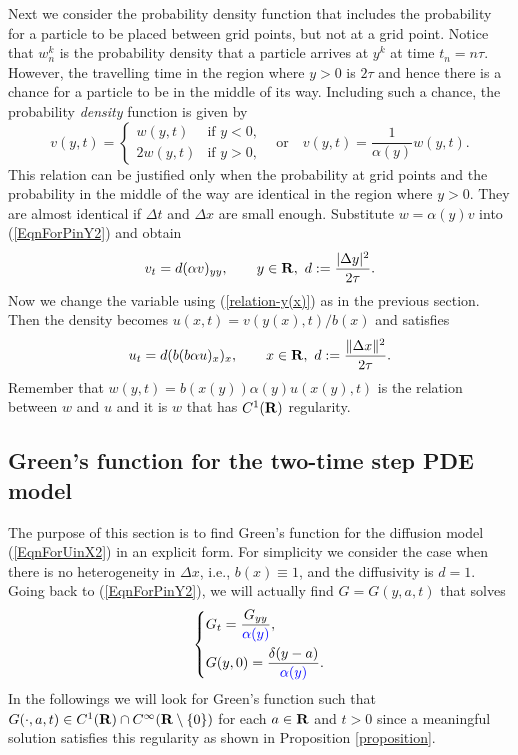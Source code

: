 \documentclass[11pt]{amsart}
\def\blue{\color{blue}}
\def\R{{\bf R}}
\def\R{\mathbb{R}}
\def\d{d}
\def\R{{\bf R}}
\def\bfR{{\bf R}}
\begin{document}
Next we consider the probability density function that includes the probability for a particle to be placed between grid points, but not at a grid point. Notice that $w_n^k$ is the probability density that a particle arrives at $y^k$ at time $t_n=n\tau$. However, the travelling time in the region where $y>0$ is $2\tau$ and hence there is a chance for a particle to be in the middle of its way. Including such a chance, the probability \emph{density} function is given by
\begin{equation*}\label{density}
v(y,t)=
\begin{cases}
w(y,t) & \text{if $y<0$,}\\
2w(y,t) & \text{if $y>0$,}
\end{cases}
\quad \text{or}\quad v(y,t)=\frac{1}{\alpha(y)}w(y,t).
\end{equation*}
This relation can be justified only when the probability at grid points and the probability in the middle of the way are identical in the region where $y>0$. They are almost identical if $\Delta t$ and $\Delta x$ are small enough. Substitute $w=\alpha(y)v$ into (\ref{EqnForPinY2}) and obtain
\begin{equation*}\label{EqnForUinY2}
v_t=\d (\alpha v)_{yy},\qquad y\in\bfR,\ \d:={|\Delta y|^2\over 2\tau}.
\end{equation*}
Now we change the variable using (\ref{relation-y(x)}) as in the previous section. Then the density becomes $u(x,t)=v(y(x),t)/b(x)$ and satisfies
\begin{equation}\label{EqnForUinX2}
u_t=\d (b(b\alpha u)_{x})_{x},\qquad x\in\bfR,\ \d:={\|\Delta x\|^2\over 2\tau}.
\end{equation}
Remember that $w(y,t)=b(x(y))\alpha(y)u(x(y),t)$ is the relation between $w$ and $u$ and it is $w$ that has $C^1(\R)$ regularity.

\subsection{Green's function for the two-time step PDE model} \label{sect.explicit}

The purpose of this section is to find Green's function for the diffusion model (\ref{EqnForUinX2}) in an explicit form. For simplicity we consider the case when there is no heterogeneity in $\Delta x$, i.e., $b(x)\equiv 1$, and the diffusivity is $\d=1$. Going back to (\ref{EqnForPinY2}), we will actually find  $G=G(y,a,t)$ that solves
\[\left\{
\begin{aligned}
&G_t= \frac{G_{yy}}{\blue \alpha(y)},\\
&G(y,0)=\frac{\delta(y-a)}{\blue \alpha(y)}.
\end{aligned}
\right.\]
In the followings we will look for Green's function such that $G(\cdot,a,t)\in C^1(\R)\cap C^\infty(\R\setminus\{0\})$ for each $a\in\bfR$ and $t>0$ since a meaningful solution satisfies this regularity as shown in Proposition \ref{proposition}.
\end{document}
